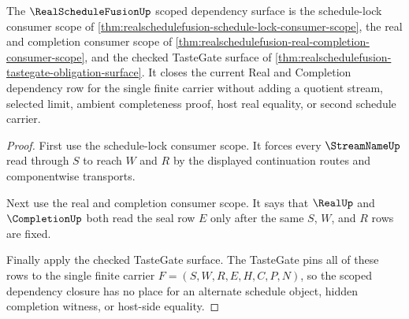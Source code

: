 \begin{theorem}
\label{thm:realschedulefusion-scoped-dependency-closure}
The $\RealScheduleFusionUp$ scoped dependency surface is the schedule-lock consumer scope of \autoref{thm:realschedulefusion-schedule-lock-consumer-scope}, the real and completion consumer scope of \autoref{thm:realschedulefusion-real-completion-consumer-scope}, and the checked TasteGate surface of \autoref{thm:realschedulefusion-tastegate-obligation-surface}. It closes the current Real and Completion dependency row for the single finite carrier without adding a quotient stream, selected limit, ambient completeness proof, host real equality, or second schedule carrier.
\end{theorem}
\begin{proof}
First use the schedule-lock consumer scope. It forces every $\StreamNameUp$ read through $S$ to reach $W$ and $R$ by the displayed continuation routes and componentwise transports.

Next use the real and completion consumer scope. It says that $\RealUp$ and $\CompletionUp$ both read the seal row $E$ only after the same $S$, $W$, and $R$ rows are fixed.

Finally apply the checked TasteGate surface. The TasteGate pins all of these rows to the single finite carrier $F=(S,W,R,E,H,C,P,N)$, so the scoped dependency closure has no place for an alternate schedule object, hidden completion witness, or host-side equality.
\end{proof}

